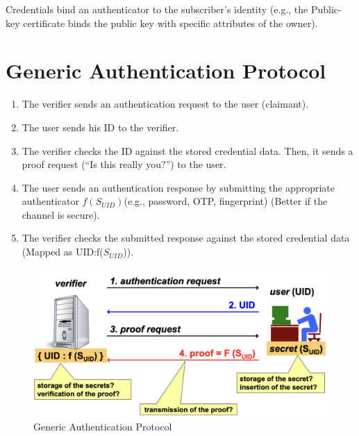\begin{tcolorbox}[colback=blue!10!white, colframe=blue!50!white]
Credentials bind an authenticator to the subscriber's identity (e.g., the Public-key certificate binds the public key with specific attributes of the owner).
\end{tcolorbox}

\clearpage
\section{Generic Authentication Protocol}
\begin{enumerate}
    \item The verifier sends an authentication request to the user (claimant).
    \item The user sends his ID to the verifier.
    \item The verifier checks the ID against the stored credential data. Then, it sends a proof request (“Is this really you?”) to the user.
    \item The user sends an authentication response by submitting the appropriate authenticator $f(S_{UID})$(e.g., password, OTP, fingerprint) (Better if the channel is secure).
    \item The verifier checks the submitted response against the stored credential data (Mapped as UID:f($S_{UID}$)).
\end{enumerate}

\begin{figure}[H]
    \centering
    \includegraphics[width=0.5\linewidth]{Images/Authentication/authNprot.png}
    \caption{Generic Authentication Protocol}
\end{figure}

